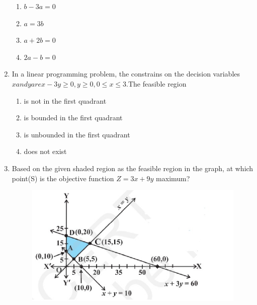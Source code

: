 \documentclass{article}
\begin{document}
\begin{enumerate}
\begin{enumerate}
    \item $b-3a=0$
    \item $a=3b$
    \item $a+2b=0$
    \item $2a-b=0$
\end{enumerate}
\item In a linear programming problem, the constrains on the decision variables $x and y are x-3y \geq 0, y \geq 0, 0\leq x \leq 3$.The feasible region 
\begin{enumerate}
    \item is not in the first quadrant
    \item is bounded in the first quadrant 
    \item is unbounded in the first quadrant 
    \item does not exist  
\end{enumerate}
\item Based on the given shaded region as the feasible region in the graph, at which point(S) is the objective function $Z=3x+9y$ maximum?
\begin{figure}[h]
    \centering{}
    \includegraphics[width=\columnwidth]{figs/fig1.jpg}
    

\end{figure}
\end{enumerate}
\end{document}
